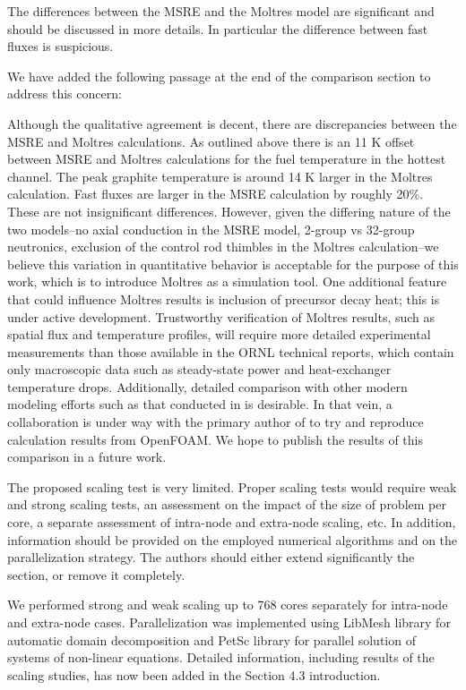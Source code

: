 \documentclass[answers,11pt]{exam}
\begin{document}
\begin{questions}
\question The differences between the MSRE and the Moltres model are significant
and should be discussed in more details. In particular the difference between
fast fluxes is suspicious.
\begin{solution}
        We have added the following passage at the end of the comparison section
        to address this concern:

        Although the qualitative agreement is decent, there are discrepancies
        between the \gls{MSRE} and Moltres calculations. As outlined above there
        is an 11 K offset between \gls{MSRE} and Moltres calculations for the
        fuel temperature in the hottest channel. The peak graphite temperature
        is around 14 K larger in the Moltres calculation. Fast fluxes are larger
        in the \gls{MSRE} calculation by roughly 20\%. These are not
        insignificant differences. However, given the differing nature of the
        two models--no axial conduction in the \gls{MSRE} model, 2-group vs
        32-group neutronics, exclusion of the control rod thimbles in the
        Moltres calculation--we believe this variation in quantitative behavior
        is acceptable for the purpose of this work, which is to introduce
        Moltres as a simulation tool. One additional feature that could
        influence Moltres results is inclusion of precursor decay heat; this is
        under active development. Trustworthy verification of Moltres results,
        such as spatial flux and temperature profiles, will require more
        detailed experimental measurements than those available in the
        \gls{ORNL} technical reports, which contain only macroscopic data such
        as steady-state power and heat-exchanger temperature
        drops. Additionally, detailed comparison with other modern modeling
        efforts such as that conducted in
        \cite{aufiero_development_2014,laureau_transient_2017} is desirable. In
        that vein, a collaboration is under way with the primary author of
        \cite{aufiero_develoment_2014} to try and reproduce calculation results
        from OpenFOAM. We hope to publish the results of this comparison in a
        future work.
\end{solution}

\question The proposed scaling test is very limited. Proper scaling tests would
require weak and strong scaling tests, an assessment on the impact of the size
of problem per core, a separate assessment of intra-node and extra-node scaling,
etc. In addition, information should be provided on the employed numerical
algorithms and on the parallelization strategy. The authors should either extend
significantly the section, or remove it completely.
\begin{solution}
        We performed strong and weak scaling up to 768 cores separately for
        intra-node and extra-node cases. Parallelization was implemented using
        LibMesh library for automatic domain decomposition and PetSc
        library for parallel solution of systems of non-linear equations.
        Detailed information, including results of the scaling studies, has now
        been added in the Section 4.3 introduction.
\end{solution}


\end{questions}


  
\end{document}
